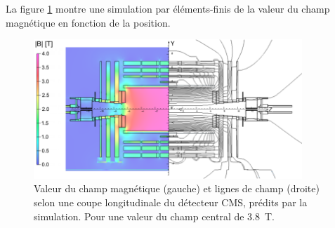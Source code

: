 \newpage
La figure \ref{CHAMP} montre une simulation par éléments-finis de la valeur du champ magnétique en fonction de la position.
\begin{figure}[ht!]
	\centering
	\includegraphics[width=0.90\textwidth]{CMS/CHAMP.png}
	\captionsetup{type=figure}\caption{Valeur du champ magnétique (gauche) et lignes de champ (droite) selon une coupe longitudinale du détecteur CMS, prédits par la simulation. Pour une valeur du champ central de \SI{3.8}{\tesla}.}
	\label{CHAMP}
\end{figure}
